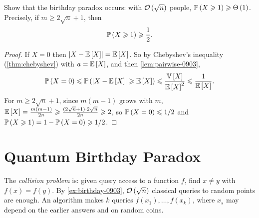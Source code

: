 \begin{exercisebox}
\begin{exercise}\label{ex:birthday-0903}\label{thm:birthday-0903}
    Show that the birthday paradox occurs: with $\mathcal{O}\left(\sqrt{n}\right)$ people,
    $\prob{X \geq 1} \geq \bigTh{1}$. Precisely, if $m \geq 2\sqrt{n} + 1$, then
    \[\prob{X \geq 1} \geq \frac{1}{2}.\]
\end{exercise}
\tcblower
\begin{proof}
    If $X = 0$ then $\abs{X - \expectation{X}} = \expectation{X}$. So by Chebyshev's inequality
    (\cref{thm:chebyshev}) with $a = \expectation{X}$, and then \cref{lem:pairwise-0903},
    \[\prob{X = 0} \leq \prob{\abs{X - \expectation{X}} \geq \expectation{X}}
        \leq \frac{\variance{X}}{\expectation{X}^2} \leq \frac{1}{\expectation{X}}.\]
    For $m \geq 2\sqrt{n} + 1$, since $m(m-1)$ grows with $m$,
    $\expectation{X} = \frac{m(m-1)}{2n} \geq \frac{(2\sqrt{n} + 1) \cdot 2\sqrt{n}}{2n} \geq 2$,
    so $\prob{X = 0} \leq \sfrac{1}{2}$ and $\prob{X \geq 1} = 1 - \prob{X = 0} \geq \sfrac{1}{2}$.
\end{proof}
\end{exercisebox}

\section{Quantum Birthday Paradox}

%
The \emph{collision problem} is: given query access to a function $f$, find $x \neq y$ with
$f(x) = f(y)$. By \cref{ex:birthday-0903}, $\mathcal{O}\left(\sqrt{n}\right)$ classical queries to random points
are enough. An algorithm makes $k$ queries $f(x_1), \dots, f(x_k)$, where $x_s$ may depend on the
earlier answers and on random coins.

